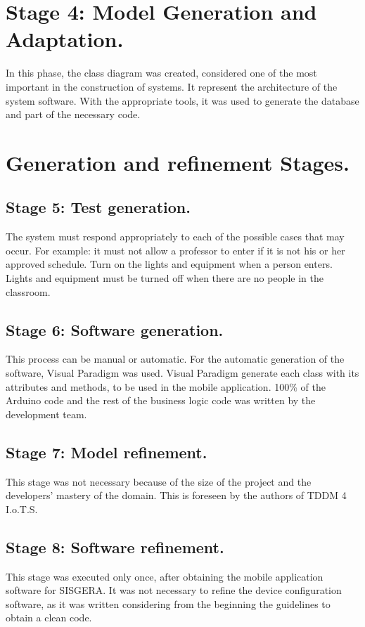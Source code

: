 \documentclass[]{scrartcl}
\begin{document}
\section*{Stage 4: Model Generation and Adaptation.}
 	In this phase, the class diagram was created, considered one of the most important in the construction of systems. It represent the architecture of the system software. With the appropriate tools, it was used to generate the database and part of the necessary code.
	
\section*{Generation and refinement Stages.}
	\subsection*{Stage 5: Test generation.}
	The system must respond appropriately to each of the possible cases that may occur. For example: it must not allow a professor to enter if it is not his or her approved schedule. Turn on the lights and equipment when a person enters. Lights and equipment must be turned off when there are no people in the classroom.
	
	\subsection*{Stage 6: Software generation.}	
	This process can be manual or automatic. For the automatic generation of the software, Visual Paradigm was used. Visual Paradigm generate each class with its attributes and methods, to be used in the mobile application. 100\% of the Arduino code and the rest of the business logic code was written by the development team.
	
	\subsection*{Stage 7: Model refinement.}	
	This stage was not necessary because of the size of the project and the developers' mastery of the domain. This is foreseen by the authors of TDDM 4 I.o.T.S.
	
	\subsection*{Stage 8: Software refinement.}	
	This stage was executed only once, after obtaining the mobile application software for SISGERA. It was not necessary to refine the device configuration software, as it was written considering from the beginning the guidelines to obtain a clean code.
\end{document}
